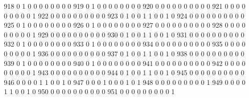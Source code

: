 \documentclass[compress,8pt]{beamer}
\begin{document}
\begin{frame}
\begin{Schunk}
  918      0       1   0              0        0    0       0       0   0   0
  919      0       1   0              0        0    0       0       0   0   0
  920      0       0   0              0        0    0       0       0   0   0
  921      0       0   0              0        0    0       0       0   0   1
  922      0       0   0              0        0    0       0       0   0   0
  923      0       1   0              0        1    1       0       0   1   0
  924      0       0   0              0        0    0       0       0   0   0
  925      0       1   0              0        0    0       0       0   0   0
  926      0       1   0              0        0    0       0       0   0   0
  927      0       0   0              0        0    0       0       0   0   0
  928      0       0   0              0        0    0       0       0   0   1
  929      0       0   0              0        0    0       0       0   0   0
  930      0       1   0              0        1    1       0       0   1   0
  931      0       0   0              0        0    0       0       0   0   0
  932      0       1   0              0        0    0       0       0   0   0
  933      0       1   0              0        0    0       0       0   0   0
  934      0       0   0              0        0    0       0       0   0   0
  935      0       0   0              0        0    0       0       0   0   1
  936      0       0   0              0        0    0       0       0   0   0
  937      0       1   0              0        1    1       0       0   1   0
  938      0       0   0              0        0    0       0       0   0   0
  939      0       1   0              0        0    0       0       0   0   0
  940      0       1   0              0        0    0       0       0   0   0
  941      0       0   0              0        0    0       0       0   0   0
  942      0       0   0              0        0    0       0       0   0   1
  943      0       0   0              0        0    0       0       0   0   0
  944      0       1   0              0        1    1       0       0   1   0
  945      0       0   0              0        0    0       0       0   0   0
  946      0       0   0              0        1    1       0       0   1   0
  947      0       0   0              1        0    0       0       1   0   1
  948      0       0   0              0        0    0       0       0   0   1
  949      0       0   0              0        1    1       0       0   1   0
  950      0       0   0              0        0    0       0       0   0   0
  951      0       0   0              0        0    0       0       0   0   1

\end{Schunk}
\end{frame}
\end{document}
